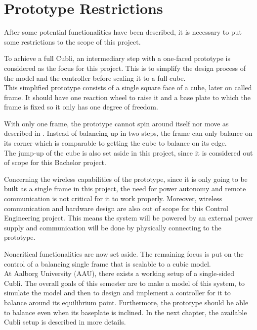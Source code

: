 \section{Prototype Restrictions}\label{sec:protoRestrictions}
After some potential functionalities have been described, it is necessary to put some restrictions to the scope of this project.

To achieve a full Cubli, an intermediary step with a one-faced prototype is considered as the focus for this project. This is to simplify the design process of the model and the controller before scaling it to a full cube.\\
This simplified prototype consists of a single square face of a cube, later on called frame. It should have one reaction wheel to raise it and a base plate to which the frame is fixed so it only has one degree of freedom.

With only one frame, the prototype cannot spin around itself nor move as described in . Instead of balancing up in two steps, the frame can only balance on its corner which is comparable to getting the cube to balance on its edge.\\
The jump-up of the cube is also set aside in this project, since it is considered out of scope for this Bachelor project.

Concerning the wireless capabilities of the prototype, since it is only going to be built as a single frame in this project, the need for power autonomy and remote communication is not critical for it to work properly. Moreover, wireless communication and hardware design are also out of scope for this Control Engineering project. This means the system will be powered by an external power supply and communication will be done by physically connecting to the prototype.

Noncritical functionalities are now set aside. The remaining focus is put on the control of a balancing single frame that is scalable to a cubic model.\\
At Aalborg University (AAU), there exists a working setup of a single-sided Cubli. The overall goals of this semester are to make a model of this system, to simulate the model and then to design and implement a controller for it to balance around its equilibrium point. Furthermore, the prototype should be able to balance even when its baseplate is inclined.
In the next chapter, the available Cubli setup is described in more details.



